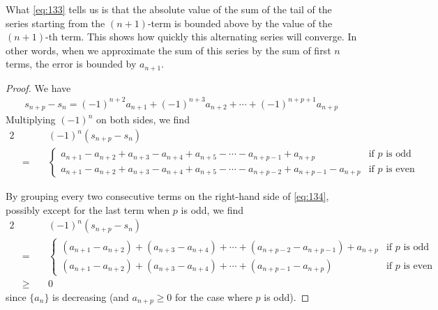 \documentclass[thmcnt=section, 12pt]{my-elegantbook}
\begin{document}
\begin{note}
    What \eqref{eq:133} tells us is that
    the absolute value of the
    sum of the tail of the series starting
    from the $(n+1)$-term is bounded above
    by the value of the $(n+1)$-th term.
    This shows how quickly this
    alternating series will converge.
    In other words, when we approximate the sum
    of this series by the sum of first $n$ terms,
    the error is bounded by $a_{n+1}$.
\end{note}

\begin{proof}
    We have
    \begin{align*}
        s_{n+p} - s_n
        = (-1)^{n+2} a_{n+1}
        + (-1)^{n+3} a_{n+2}
        + \cdots
        + (-1)^{n+p+1} a_{n+p}
    \end{align*}
    Multiplying $(-1)^n$ on both sides, we find
    \begin{alignat}{2}
         &   & \; & (-1)^{n} (s_{n+p} - s_{n}) \nonumber           \\
         & = &    & \begin{cases}
                        a_{n+1} - a_{n+2} + a_{n+3} - a_{n+4} + a_{n+5}
                        - \cdots - a_{n+p-1} + a_{n+p}
                         & \text{if $p$ is odd}  \\
                        a_{n+1} - a_{n+2} + a_{n+3} - a_{n+4} + a_{n+5}
                        - \cdots - a_{n+p-2} + a_{n+p-1} - a_{n+p}
                         & \text{if $p$ is even}
                    \end{cases}
        \label{eq:134}
    \end{alignat}

    By grouping every two consecutive terms on the
    right-hand side of \eqref{eq:134},
    possibly except for the last term when $p$ is odd,
    we find
    \begin{alignat*}{2}
         &      & \; & (-1)^{n} (s_{n+p} - s_{n})                   \\
         & =    &    & \begin{cases}
                           (a_{n+1} - a_{n+2}) + (a_{n+3} - a_{n+4})
                           + \cdots + (a_{n+p-2} - a_{n+p-1}) + a_{n+p}
                            & \text{if $p$ is odd}  \\
                           (a_{n+1} - a_{n+2}) + (a_{n+3} - a_{n+4})
                           + \cdots + (a_{n+p-1} - a_{n+p})
                            & \text{if $p$ is even}
                       \end{cases} \\
         & \geq &    & 0
    \end{alignat*}
    since $\{a_n\}$ is decreasing
    (and $a_{n+p} \geq 0$ for the case where $p$ is odd).


\end{proof}
\end{document}
